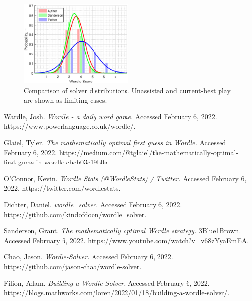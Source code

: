 \documentclass[twocolumn]{tudelft-aiaa}
\begin{document}
\begin{figure}[h!]
  \centering
    \includegraphics[width=0.5\textwidth]{performance_comparison.eps}
  \caption{Comparison of solver distributions. \rm Unassisted and current-best play are shown as limiting cases.}
\label{performance_comparison}
\end{figure}



\raggedright



\begin{thebibliography}{9}

Wardle, Josh. \emph{Wordle - a daily word game.} Accessed February 6, 2022. https://www.powerlanguage.co.uk/wordle/.

Glaiel, Tyler. \emph{The mathematically optimal first guess in Wordle.} Accessed February 6, 2022. https://medium.com/@tglaiel/the-mathematically-optimal-first-guess-in-wordle-cbcb03c19b0a.

O'Connor, Kevin. \emph{Wordle Stats (@WordleStats) / Twitter.} Accessed February 6, 2022. https://twitter.com/wordlestats.

Dichter, Daniel. \emph{wordle\_solver.} Accessed February 6, 2022. https://github.com/kindofdoon/wordle\_solver.

Sanderson, Grant. \emph{The mathematically optimal Wordle strategy.} 3Blue1Brown. Accessed February 6, 2022. https://www.youtube.com/watch?v=v68zYyaEmEA.

Chao, Jason. \emph{Wordle-Solver.} Accessed February 6, 2022. https://github.com/jason-chao/wordle-solver.

Filion, Adam. \emph{Building a Wordle Solver.} Accessed February 6, 2022. https://blogs.mathworks.com/loren/2022/01/18/building-a-wordle-solver/.

\end{thebibliography}
\end{document}
